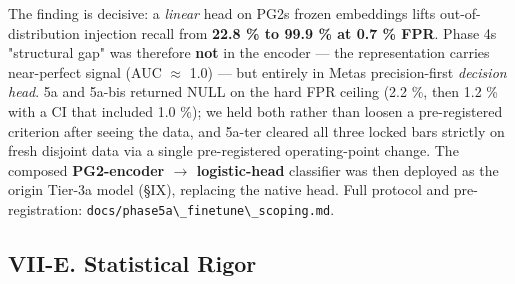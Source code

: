 {\def\LTcaptype{none} %
\begin{table}[!t]\centering\scriptsize
{}
\end{table}
}

The finding is decisive: a \emph{linear} head on PG2\textquotesingle s
frozen embeddings lifts out-of-distribution injection recall from
\textbf{22.8 \% to 99.9 \% at 0.7 \% FPR}. Phase 4\textquotesingle s
"structural gap" was therefore \textbf{not} in the encoder --- the
representation carries near-perfect signal (AUC $\approx$ 1.0) --- but entirely
in Meta\textquotesingle s precision-first \emph{decision head}. 5a and
5a-bis returned NULL on the hard FPR ceiling (2.2 \%, then 1.2 \% with a
CI that included 1.0 \%); we held both rather than loosen a
pre-registered criterion after seeing the data, and 5a-ter cleared all
three locked bars strictly on fresh disjoint data via a single
pre-registered operating-point change. The composed \textbf{PG2-encoder
$\to$ logistic-head} classifier was then deployed as the origin Tier-3a
model (§IX), replacing the native head. Full protocol and
pre-registration:
\passthrough{\lstinline!docs/phase5a\_finetune\_scoping.md!}.

\subsection{VII-E. Statistical Rigor}\label{vii-e-statistical-rigor}

